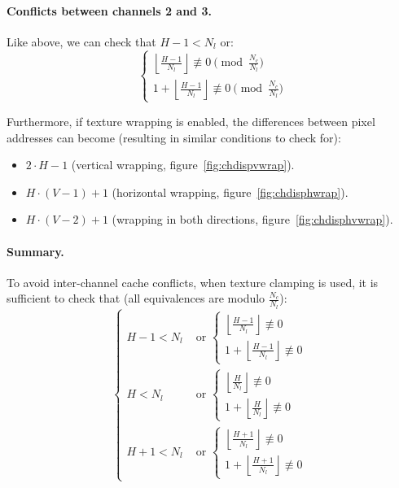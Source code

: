 \documentclass[a4paper,11pt]{kthesis}
\begin{document}
\paragraph{Conflicts between channels 2 and 3.}
Like above, we can check that $H-1 < N_{l}$ or:
\begin{equation}~\label{eq:noconflictwrap2}
\begin{cases}
\left\lfloor \frac{H-1}{N_{l}} \right\rfloor \not \equiv 0 \pmod{\frac{N_{c}}{N_{l}}} \\
1 + \left\lfloor \frac{H-1}{N_{l}} \right\rfloor \not \equiv 0 \pmod{\frac{N_{c}}{N_{l}}}
\end{cases}
\end{equation}

Furthermore, if texture wrapping is enabled, the differences between pixel addresses can become (resulting in similar conditions to check for):
\begin{itemize}
\item $2 \cdot H - 1$ (vertical wrapping, figure~\ref{fig:chdispvwrap}).
\item $H \cdot (V - 1) + 1$ (horizontal wrapping, figure~\ref{fig:chdisphwrap}).
\item $H \cdot (V - 2) + 1$ (wrapping in both directions, figure~\ref{fig:chdisphvwrap}).
\end{itemize}

\paragraph{Summary.}
To avoid inter-channel cache conflicts, when texture clamping is used, it is sufficient to check that (all equivalences are modulo $\frac{N_{c}}{N_{l}}$):
\begin{equation}
\boxed{
\begin{cases}
H-1 < N_{l} & \textrm{ or } \begin{cases}
\left\lfloor \frac{H-1}{N_{l}} \right\rfloor \not \equiv 0 \\
1 + \left\lfloor \frac{H-1}{N_{l}} \right\rfloor \not \equiv 0
\end{cases} \\
H < N_{l} & \textrm{ or } \begin{cases}
\left\lfloor \frac{H}{N_{l}} \right\rfloor \not \equiv 0 \\
1 + \left\lfloor \frac{H}{N_{l}} \right\rfloor \not \equiv 0
\end{cases} \\
H+1 < N_{l} & \textrm{ or } \begin{cases}
\left\lfloor \frac{H+1}{N_{l}} \right\rfloor \not \equiv 0 \\
1 + \left\lfloor \frac{H+1}{N_{l}} \right\rfloor \not \equiv 0
\end{cases}
\end{cases}
}
\end{equation}
\end{document}
